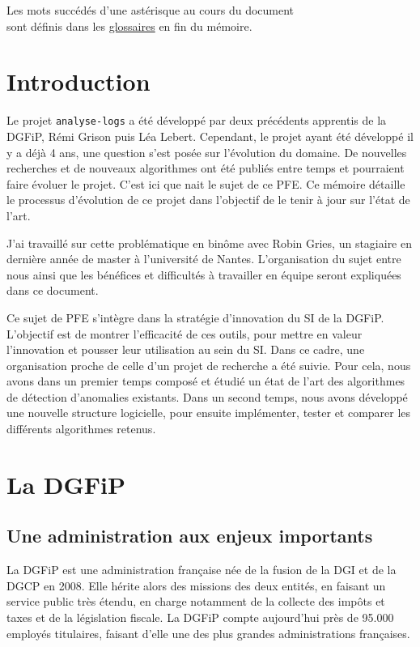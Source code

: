 \documentclass[openany, 11pt]{memoir}
\newcommand\chapters[1]{
	\chapter*{#1}
	\addcontentsline{toc}{chapter}{#1}
}
\begin{document}
\newpage
\begin{center}
	\vspace*{\fill}
	Les mots succédés d'une astérisque au cours du document\\
	sont définis dans les \hyperref[glos]{glossaires} en fin du mémoire.
    \vspace*{\fill}
\end{center}

\mainmatter
\pagestyle{fancy}
\glsresetall
\chapters{Introduction}

Le projet \texttt{analyse-logs} a été développé par deux précédents apprentis de la \gls{DGFiP}, Rémi Grison puis Léa Lebert. Cependant, le projet ayant été développé il y a déjà 4 ans, une question s'est posée sur l'évolution du domaine. De nouvelles recherches et de nouveaux algorithmes ont été publiés entre temps et pourraient faire évoluer le projet. C'est ici que nait le sujet de ce PFE. Ce mémoire détaille le processus d'évolution de ce projet dans l'objectif de le tenir à jour sur l'état de l'art.

\bigskip
J'ai travaillé sur cette problématique en binôme avec Robin Gries, un stagiaire en dernière année de master à l'université de Nantes. L'organisation du sujet entre nous ainsi que les bénéfices et difficultés à travailler en équipe seront expliquées dans ce document.

\bigskip
Ce sujet de PFE s'intègre dans la stratégie d'innovation du \gls{SI} de la \gls{DGFiP}. L'objectif est de montrer l'efficacité de ces outils, pour mettre en valeur l'innovation et pousser leur utilisation au sein du \gls{SI}. Dans ce cadre, une organisation proche de celle d'un projet de recherche a été suivie. Pour cela, nous avons dans un premier temps composé et étudié un état de l'art des algorithmes de détection d'anomalies existants. Dans un second temps, nous avons développé une nouvelle structure logicielle, pour ensuite implémenter, tester et comparer les différents algorithmes retenus.

\newpage
\chapter{La DGFiP}

\section{Une administration aux enjeux importants}
\label{dgfip}
La \gls{DGFiP} est une administration française née de la fusion de la \gls{DGI} et de la \gls{DGCP} en 2008. Elle hérite alors des missions des deux entités, en faisant un service public très étendu, en charge notamment de la collecte des impôts et taxes et de la législation fiscale. La DGFiP compte aujourd'hui près de 95.000 employés titulaires, faisant d'elle une des plus grandes administrations françaises.
\end{document}
